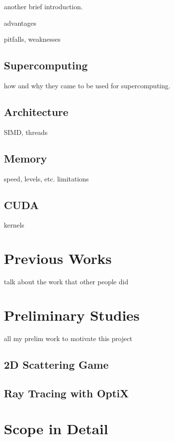 another brief introduction.  

advantages

pitfalls, weaknesses

\subsection{Supercomputing}

how and why they came to be used for supercomputing.

\subsection{Architecture}

SIMD, threads

\subsection{Memory}

speed, levels, etc.  limitations 

\subsection{CUDA}

kernels


\section{Previous Works}

talk about the work that other people did

\section{Preliminary Studies}

all my prelim work to motivate this project

\subsection{2D Scattering Game}


\subsection{Ray Tracing with OptiX}


\section{Scope in Detail}


